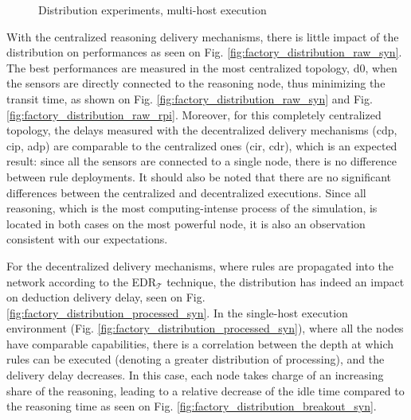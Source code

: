 \documentclass{iosart2c}
\newcommand{\edrt}{EDR$_{\mathcal{T}}$\xspace}
\begin{document}
\begin{figure}
	\Centering
	\caption{\Centering Distribution experiments, multi-host execution}
	\label{fig:factory_distribution_multi-host}
	
	\begin{minipage}{0.395\textwidth}
		\Centering
		\label{fig:factory_distribution_raw_rpi}
		\scalebox{0.8}{
			
		}
	\end{minipage}
	\begin{minipage}{0.595\textwidth}
		\Centering
		\label{fig:factory_distribution_processed_rpi}
		\scalebox{0.8}{
			
		}
	\end{minipage}
\end{figure}

With the centralized reasoning delivery mechanisms, there is little impact of the distribution on performances as seen on Fig. \ref{fig:factory_distribution_raw_syn}.
The best performances are measured in the most centralized topology, d0, when the sensors are directly connected to the reasoning node, thus minimizing the transit time, as shown on Fig. \ref{fig:factory_distribution_raw_syn} and Fig. \ref{fig:factory_distribution_raw_rpi}.
Moreover, for this completely centralized topology, the delays measured with the decentralized delivery mechanisms (\gls{cdp}, \gls{cip}, \gls{adp}) are comparable to the centralized ones (\gls{cir}, \gls{cdr}), which is an expected result: since all the sensors are connected to a single node, there is no difference between rule deployments.
It should also be noted that there are no significant differences between the centralized and decentralized executions.
Since all reasoning, which is the most computing-intense process of the simulation, is located in both cases on the most powerful node, it is also an observation consistent with our expectations.

For the decentralized delivery mechanisms, where rules are propagated into the network according to the \edrt technique, the distribution has indeed an impact on deduction delivery delay, seen on Fig. \ref{fig:factory_distribution_processed_syn}.
In the single-host execution environment (Fig. \ref{fig:factory_distribution_processed_syn}), where all the nodes have comparable capabilities, there is a correlation between the depth at which rules can be executed (denoting a greater distribution of processing), and the delivery delay decreases.
In this case, each node takes charge of an increasing share of the reasoning, leading to a relative decrease of the idle time compared to the reasoning time as seen on Fig. \ref{fig:factory_distribution_breakout_syn}.
\end{document}
